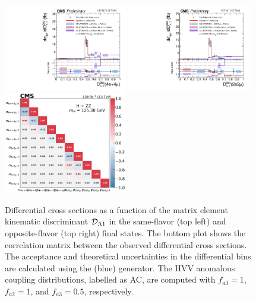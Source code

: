 \clearpage

\begin{center}
	\begin{figure}[!htb]
		\centering
		\includegraphics[width=0.48\textwidth]{Images/H4L/discriminants/model_v4/DL1_unfoldwith_4l_SM_125_asimov.pdf}
		\includegraphics[width=0.48\textwidth]{Images/H4L/discriminants/model_v4/DL1_unfoldwith_2e2mu_SM_125_asimov.pdf}\\
		\includegraphics[width=0.48\textwidth]{Images/H4L/correlations/corr_DL1_v4.pdf}\\
		\caption{
			Differential cross sections as a function of the matrix element kinematic discriminant ${\mathcal D}_{\Lambda\text{1}}$ in the same-flavor (top left) and opposite-flavor (top right)  final states.
			The bottom plot shows the correlation matrix between the observed differential cross sections.
			The acceptance and theoretical uncertainties in the differential bins are calculated using the \POWHEG (blue) generator.
			The HVV anomalous coupling distributions, labelled as AC, are computed with $f_{a3} = 1$, $f_{a2} = 1$, and $f_{a3} = 0.5$, respectively.
			\label{fig:fidDL1}}
	\end{figure}
\end{center}

